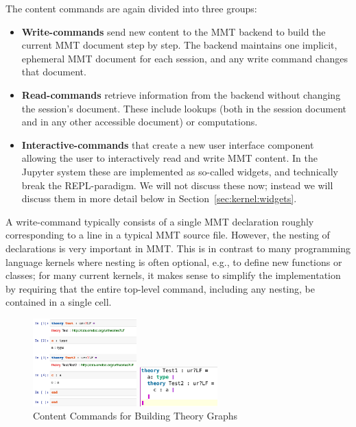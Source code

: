 The content commands are again divided into three groups:
\begin{itemize}
 \item \textbf{Write-commands} send new content to the MMT backend to build the current MMT document step by step.
   The backend maintains one implicit, ephemeral MMT document for each session, and any write command changes that document.
 \item \textbf{Read-commands} retrieve information from the backend without changing the session's document.
   These include lookups (both in the session document and in any other accessible document) or computations.
  \item \textbf{Interactive-commands} that create a new user interface component allowing the user to interactively read and write MMT content. 
   In the Jupyter system these are implemented as so-called widgets, and technically break the REPL-paradigm. 
   We will not discuss these now; instead we will discuss them in more detail below in Section~\ref{sec:kernel:widgets}. 
\end{itemize}

A write-command typically consists of a single MMT declaration roughly corresponding to a line in a typical MMT source file.
However, the nesting of declarations is very important in MMT.
This is in contrast to many programming language kernels where nesting is often optional, e.g., to define new functions or classes;
for many current kernels, it makes sense to simplify the implementation by requiring that the entire top-level command, including any nesting, be contained in a single cell.

\begin{figure}
  \vspace{-20pt}
  \begin{minipage}[c]{4cm}\includegraphics[width=4cm]{screenshots/nesting}\end{minipage}
  \begin{minipage}[c]{3cm}\includegraphics[width=3cm]{../D4.11/test_theory}\end{minipage}
  \caption{Content Commands for Building Theory Graphs}\label{fig:test_theory}
  \vspace{-20pt}
\end{figure}


